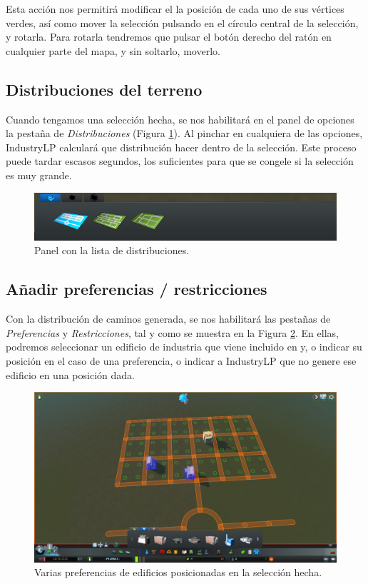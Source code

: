 Esta acción nos permitirá modificar el la posición de cada uno de sus vértices verdes, así como mover la selección pulsando en el círculo central de la selección, y rotarla. Para rotarla tendremos que pulsar el botón derecho del ratón en cualquier parte del mapa, y sin soltarlo, moverlo.

\subsection{Distribuciones del terreno}

Cuando tengamos una selección hecha, se nos habilitará en el panel de opciones la pestaña de \textit{Distribuciones} (Figura \ref{fig:distributions-panel}). Al pinchar en cualquiera de las opciones, IndustryLP calculará que distribución hacer dentro de la selección. Este proceso puede tardar escasos segundos, los suficientes para que \cities se congele si la selección es muy grande.

\begin{figure}[h]
	\centering
	\includegraphics[width=\textwidth]{images/distributions}
	\caption{Panel con la lista de distribuciones.}
	\label{fig:distributions-panel}
\end{figure}

\subsection{Añadir preferencias / restricciones}
\label{subsec:pref}

Con la distribución de caminos generada, se nos habilitará las pestañas de \textit{Preferencias} y \textit{Restricciones}, tal y como se muestra en la Figura \ref{fig:preferences}. En ellas, podremos seleccionar un edificio de industria que viene incluido en \cities y, o indicar su posición en el caso de una preferencia, o indicar a IndustryLP que no genere ese edificio en una posición dada. \\

\begin{figure}[h]
	\centering
	\includegraphics[width=\textwidth]{images/preferences}
	\caption{Varias preferencias de edificios posicionadas en la selección hecha.}
	\label{fig:preferences}
\end{figure}

